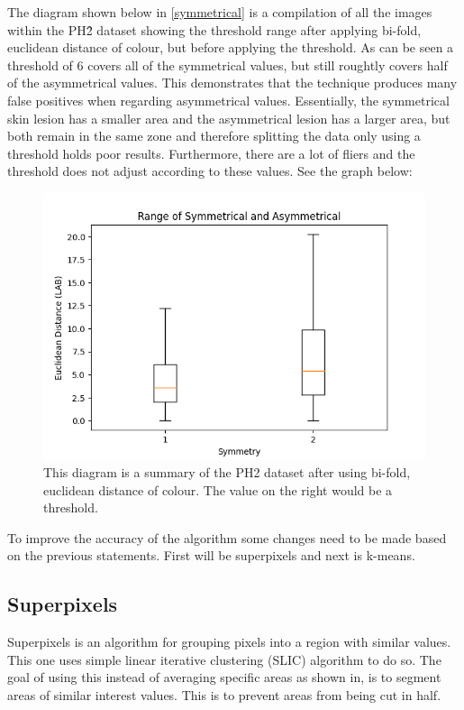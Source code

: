 The diagram shown below in \ref{symmetrical} is a compilation of all the images within the PH\^2 dataset showing the threshold range after applying bi-fold, euclidean distance of colour, but before applying the threshold. As can be seen a threshold of 6 covers all of the symmetrical values, but still roughtly covers half of the asymmetrical values. This demonstrates that the technique produces many false positives when regarding asymmetrical values.
Essentially, the symmetrical skin lesion has a smaller area and the asymmetrical lesion has a larger area, but both remain in the same zone and therefore splitting the data only using a threshold holds poor results. Furthermore, there are a lot of fliers and the threshold does not adjust according to these values. See the graph below:

\begin{figure} 
    \centering
    \includegraphics[scale=0.6]{images/symmetrical.png}
\caption{This diagram is a summary of the PH2 dataset after using bi-fold, euclidean distance of colour. The value on the right would be a threshold.}
\end{figure} \label{symmetrical}
    
To improve the accuracy of the algorithm some changes need to be made based on the previous statements. First will be superpixels and next is k-means.

\subsection{Superpixels}
Superpixels is an algorithm for grouping pixels into a region with similar values. This one uses simple linear iterative clustering (SLIC) algorithm\cite{Achanta2012} to do so. The goal of using this instead of averaging specific areas as shown in\cite{Kasmi2016}, is to segment areas of similar interest values. This is to prevent areas from being cut in half.


